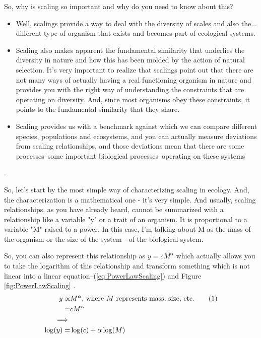\documentclass[]{article}
\newcommand\numberthis{\addtocounter{equation}{1}\tag{\theequation}}
\begin{document}
So, why is scaling so important
and why do you need to know about this?
\begin{itemize}
	\item Well, scalings provide a way to deal with the diversity of scales and also the... different type of organism that exists and becomes part of ecological systems.
	\item Scaling also makes apparent the fundamental similarity that underlies the diversity in nature and how this has been molded by the action of natural selection. It's very important to realize that scalings point out that there are not many ways of actually having a real functioning organism in nature and provides you with the right way of understanding the constraints that are operating on diversity. And, since most organisms obey these constraints, it points to the fundamental similarity that they share.

	\item Scaling provides us with a  benchmark against which we can compare different species, populations and ecosystems, and you can actually measure deviations from scaling relationships, and those deviations mean that there are some processes--some important biological processes--operating on these systems
\end{itemize}.

So, let's start by the most simple way
of characterizing scaling in ecology.
And, the characterization
is a mathematical one - it's very simple.
And usually, scaling relationships,
as you have already heard,
cannot be summarized with
a relationship like a variable "y"
or a trait of an organism.
It is proportional to a variable "M"
raised to a power.
In this case, I'm talking about M
as the mass of the organism
or the size of the system -
of the biological system.

So, you can also represent this relationship as $y=c M^\alpha$ which actually allows you to take the logarithm of this relationship and transform something which is not linear into a linear equation--(\ref{eq:PowerLawScaling}) and Figure \ref{fig:PowerLawScaling} .
\begin{align*}
	y \propto& M^{\alpha}\text{, where $M$ represents mass, size, etc.}\numberthis\label{eq:PowerLawScaling}\\
	=& c M^{\alpha}\\
	\implies&\\
	\log(y)=&\log(c) + \alpha \log(M)
\end{align*}
\end{document}
